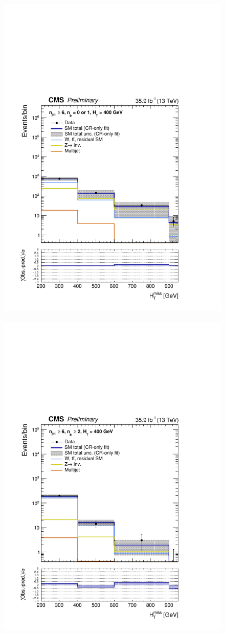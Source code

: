 \begin{figure}[h!]
  \centering
    \caption{
    }
  \includegraphics[width=0.49\linewidth]{figures/results/36invfb/aggregated/postFitShapeCR/mhtShape_eq01b_ge6j_400_Inf_crfit.pdf} ~
  \includegraphics[width=0.49\linewidth]{figures/results/36invfb/aggregated/postFitShapeCR/mhtShape_ge2b_ge6j_400_Inf_crfit.pdf}
  \label{fig:aggregated_results4}
\end{figure}
